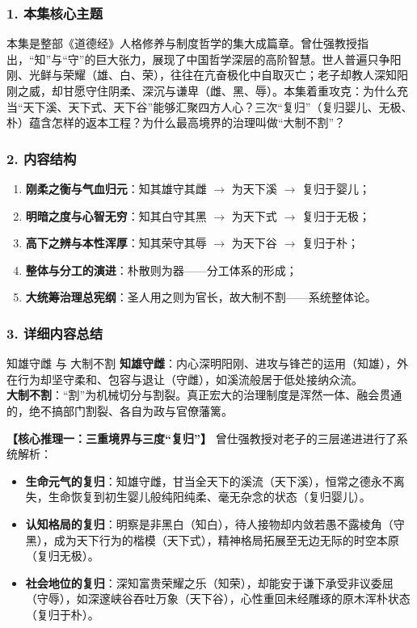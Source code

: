 \subsubsection{1. 本集核心主题}
本集是整部《道德经》人格修养与制度哲学的集大成篇章。曾仕强教授指出，“知”与“守”的巨大张力，展现了中国哲学深层的高阶智慧。世人普遍只争阳刚、光鲜与荣耀（雄、白、荣），往往在亢奋极化中自取灭亡；老子却教人深知阳刚之威，却甘愿守住阴柔、深沉与谦卑（雌、黑、辱）。本集着重攻克：为什么充当“天下溪、天下式、天下谷”能够汇聚四方人心？三次“复归”（复归婴儿、无极、朴）蕴含怎样的返本工程？为什么最高境界的治理叫做“大制不割”？

\subsubsection{2. 内容结构}
\begin{enumerate}
    \item \textbf{刚柔之衡与气血归元}：知其雄守其雌 $\rightarrow$ 为天下溪 $\rightarrow$ 复归于婴儿；
    \item \textbf{明暗之度与心智无穷}：知其白守其黑 $\rightarrow$ 为天下式 $\rightarrow$ 复归于无极；
    \item \textbf{高下之辨与本性浑厚}：知其荣守其辱 $\rightarrow$ 为天下谷 $\rightarrow$ 复归于朴；
    \item \textbf{整体与分工的演进}：朴散则为器——分工体系的形成；
    \item \textbf{大统筹治理总宪纲}：圣人用之则为官长，故大制不割——系统整体论。
\end{enumerate}

\subsubsection{3. 详细内容总结}

\begin{ConceptBox}{知雄守雌 与 大制不割}
\textbf{知雄守雌}：内心深明阳刚、进攻与锋芒的运用（知雄），外在行为却坚守柔和、包容与退让（守雌），如溪流般居于低处接纳众流。\\
\textbf{大制不割}：“割”为机械切分与割裂。真正宏大的治理制度是浑然一体、融会贯通的，绝不搞部门割裂、各自为政与官僚藩篱。
\end{ConceptBox}

\noindent\textbf{【核心推理一：三重境界与三度“复归”】}
曾仕强教授对老子的三层递进进行了系统解析：
\begin{itemize}
    \item \textbf{生命元气的复归}：知雄守雌，甘当全天下的溪流（天下溪），恒常之德永不离失，生命恢复到初生婴儿般纯阳纯柔、毫无杂念的状态（复归婴儿）。
    \item \textbf{认知格局的复归}：明察是非黑白（知白），待人接物却内敛若愚不露棱角（守黑），成为天下行为的楷模（天下式），精神格局拓展至无边无际的时空本原（复归无极）。
    \item \textbf{社会地位的复归}：深知富贵荣耀之乐（知荣），却能安于谦下承受非议委屈（守辱），如深邃峡谷吞吐万象（天下谷），心性重回未经雕琢的原木浑朴状态（复归于朴）。
\end{itemize}

